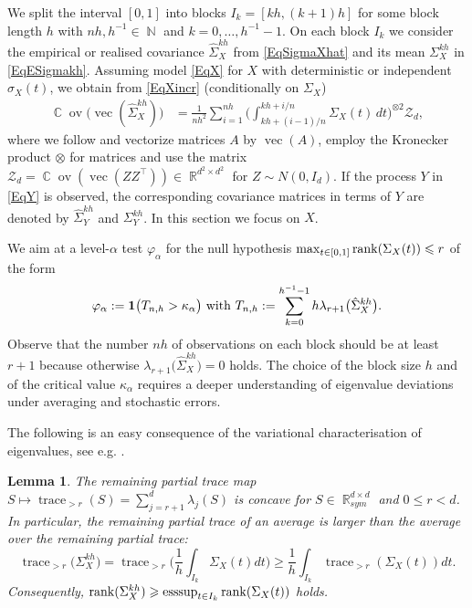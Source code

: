 \documentclass[preprint,aos]{imsart}
\numberwithin{equation}{section}
\newtheorem{lemma}[satz]{Lemma}
\theoremstyle{remark}
\DeclareMathOperator{\R}{{\mathbb R}}
\DeclareMathOperator{\C}{{\mathbb C}}
\DeclareMathOperator{\N}{{\mathbb N}}
\DeclareMathOperator{\trace}{trace}
\DeclareMathOperator{\esssup}{esssup}
\DeclareMathOperator{\vek}{vec}
\renewcommand{\phi}{\varphi}
\renewcommand{\le}{\leqslant}
\renewcommand{\ge}{\geqslant}
\providecommand{\COV}{\C\!\operatorname{ov}}
\begin{document}
We split the interval $[0,1]$ into blocks $I_k=[kh,(k+1)h]$ for some block length $h$ with $nh,h^{-1}\in\N$ and $k=0,\ldots,h^{-1}-1$. On each block $I_k$ we consider the empirical or realised covariance $\hat\Sigma_X^{kh}$ from \eqref{EqSigmaXhat} and its mean $\Sigma_X^{kh}$ in \eqref{EqESigmakh}. Assuming  model \eqref{EqX} for $X$ with deterministic or independent $\sigma_X(t)$, we obtain from \eqref{EqXincr} (conditionally on $\Sigma_X$)
\begin{align}
\COV\big(\vek(\hat\Sigma_X^{kh})\big)&=\frac1{nh^2}\sum_{i=1}^{nh}\Big(\int_{kh+(i-1)/n}^{kh+i/n}\Sigma_X(t)\,dt\Big)^{\otimes 2}{\mathcal Z}_d,\label{EqCovSigmakh}
\end{align}
where we follow \citet{magnus1979} and vectorize matrices $A$ by $\vek(A)$, employ the Kronecker product $\otimes$ for matrices and use the matrix ${\mathcal Z_d}=\COV(\vek(ZZ^\top))\in\R^{d^2\times d^2}$ for $Z\sim N(0,I_d)$.
If the process $Y$ in \eqref{EqY} is observed, the corresponding covariance matrices in terms of $Y$ are denoted by $\hat\Sigma_Y^{kh}$ and $\Sigma_Y^{kh}$. In this section we focus on $X$.

We  aim at a level-$\alpha$ test $\phi_\alpha$ for the null hypothesis $\max_{t\in[0,1]}\rank(\Sigma_X(t))\le r$ of the form
\begin{equation}\label{Eqphi0} \phi_\alpha:={\bf 1}\big(T_{n,h}>\kappa_\alpha\big)\text{ with } T_{n,h}:=\sum_{k=0}^{h^{-1}-1} h\lambda_{r+1}\big(\hat\Sigma_X^{kh}\big).
\end{equation}
Observe that the number $nh$ of observations on each block should be at least $r+1$ because otherwise $\lambda_{r+1}\big(\hat\Sigma_X^{kh}\big)=0$ holds.
The choice of the block size $h$ and of the critical value $\kappa_\alpha$ requires a deeper understanding of eigenvalue deviations under averaging and stochastic errors.

The following is an easy consequence of the variational characterisation of eigenvalues, see e.g. \citet[Proposition 1.3.4]{tao2012}.
\begin{lemma}\label{Lemtracer}
The remaining partial trace map $S\mapsto \trace_{>r}(S)=\sum_{j=r+1}^d\lambda_j(S)$ is concave for $S\in\R^{d\times d}_{sym}$ and $0\le r<d$. In particular,
the remaining partial trace of an average is larger than the average over the remaining partial trace:
\begin{equation}\label{Eqtracer}
 \trace_{> r}\big(\Sigma_X^{kh}\big)=\trace_{> r}\Big(\frac1h\int_{I_k}\Sigma_X(t)dt\Big)\ge \frac1h\int_{I_k}\trace_{> r}(\Sigma_X(t))dt.
\end{equation}
Consequently, $\rank(\Sigma_X^{kh})\ge \esssup_{t\in I_k}\rank(\Sigma_X(t))$ holds.
  \end{lemma}
\end{document}
